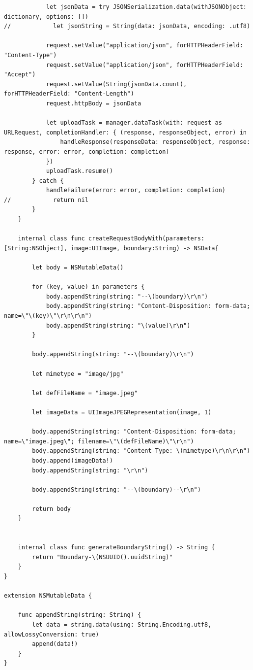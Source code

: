 \begin{lstlisting}
            let jsonData = try JSONSerialization.data(withJSONObject: dictionary, options: [])
//            let jsonString = String(data: jsonData, encoding: .utf8)
            
            request.setValue("application/json", forHTTPHeaderField: "Content-Type")
            request.setValue("application/json", forHTTPHeaderField: "Accept")
            request.setValue(String(jsonData.count), forHTTPHeaderField: "Content-Length")
            request.httpBody = jsonData
            
            let uploadTask = manager.dataTask(with: request as URLRequest, completionHandler: { (response, responseObject, error) in
                handleResponse(responseData: responseObject, response: response, error: error, completion: completion)
            })
            uploadTask.resume()
        } catch {
            handleFailure(error: error, completion: completion)
//            return nil
        }
    }
    
    internal class func createRequestBodyWith(parameters:[String:NSObject], image:UIImage, boundary:String) -> NSData{
        
        let body = NSMutableData()
        
        for (key, value) in parameters {
            body.appendString(string: "--\(boundary)\r\n")
            body.appendString(string: "Content-Disposition: form-data; name=\"\(key)\"\r\n\r\n")
            body.appendString(string: "\(value)\r\n")
        }
        
        body.appendString(string: "--\(boundary)\r\n")
        
        let mimetype = "image/jpg"
        
        let defFileName = "image.jpeg"
        
        let imageData = UIImageJPEGRepresentation(image, 1)
        
        body.appendString(string: "Content-Disposition: form-data; name=\"image.jpeg\"; filename=\"\(defFileName)\"\r\n")
        body.appendString(string: "Content-Type: \(mimetype)\r\n\r\n")
        body.append(imageData!)
        body.appendString(string: "\r\n")
        
        body.appendString(string: "--\(boundary)--\r\n")
        
        return body
    }
    
    
    internal class func generateBoundaryString() -> String {
        return "Boundary-\(NSUUID().uuidString)"
    }
}

extension NSMutableData {
    
    func appendString(string: String) {
        let data = string.data(using: String.Encoding.utf8, allowLossyConversion: true)
        append(data!)
    }
}
\end{lstlisting}

